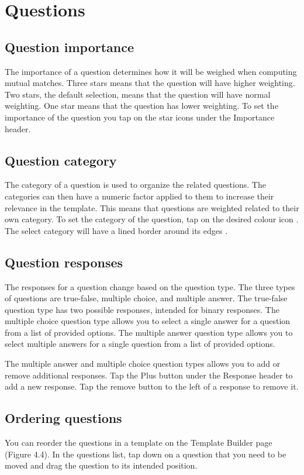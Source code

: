 \section{Questions}
\label{sec:questions}

\subsection{Question importance}
\label{sec:qimportance}
The importance of a question determines how it will be weighed when computing mutual matches.  Three stars means that the question will have higher weighting. Two stars, the default selection, means that the question will have normal weighting. One star means that the question has lower weighting.  To set the importance of the question you tap on the star icons   under the Importance header. 

\subsection{Question category}
\label{sec:qcategory}
The category of a question is used to organize the related questions.  The categories can then have a numeric factor applied to them to increase their relevance in the template.  This means that questions are weighted related to their own category.  To set the category of the question, tap on the desired colour icon  .  The select category will have a lined border around its edges  .

\subsection{Question responses}
\label{sec:qresponses}
The responses for a question change based on the question type.  The three types of questions are  true-false, multiple choice, and multiple answer.  The true-false question type has two possible responses, intended for binary responses.  The multiple choice question type allows you to select a single answer for a question from a list of provided options. The multiple answer question type allows you to select multiple answers for a single question from a list of provided options. 

The multiple answer and multiple choice question types allows you to add or remove additional responses. Tap the Plus button   under the Response header to add a new response. Tap the remove button  to the left of a response to remove it.

\subsection{Ordering questions}
\label{sec:qordering}
You can reorder the questions in a template on the Template Builder page (Figure 4.4). In the questions list, tap down on a question that you need to be moved and drag the question to its intended position. 

